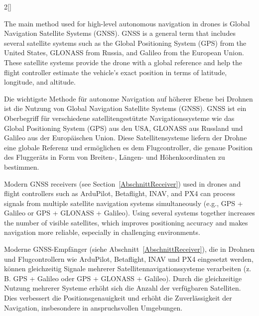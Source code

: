 \begin{paracol}{2}[]
\colende

\renewcommand{\deutschertitel}{GPS-basierte Positionsbestimmung}
\renewcommand{\englischertitel}{GPS-Based Position Estimation}
\makroabschnitt
\label{GpsBasedPosition}

The main method used for high-level autonomous navigation in drones is Global Navigation Satellite Systems (GNSS). GNSS is a general term that includes several satellite systems such as the Global Positioning System (GPS) from the United States, GLONASS from Russia, and Galileo from the European Union. These satellite systems provide the drone with a global reference and help the flight controller estimate the vehicle’s exact position in terms of latitude, longitude, and altitude.

\colger

Die wichtigste Methode für autonome Navigation auf höherer Ebene bei Drohnen ist die Nutzung von Global Navigation Satellite Systems (GNSS). GNSS ist ein Oberbegriff für verschiedene satellitengestützte Navigationssysteme wie das Global Positioning System (GPS) aus den USA, GLONASS aus Russland und Galileo aus der Europäischen Union. Diese Satellitensysteme liefern der Drohne eine globale Referenz und ermöglichen es dem Flugcontroller, die genaue Position des Fluggeräts in Form von Breiten-, Längen- und Höhenkoordinaten zu bestimmen.

\coleng

Modern GNSS receivers (see Section~\ref{AbschnittReceiver}) used in drones and flight controllers such as ArduPilot, Betaflight, INAV, and PX4 can process signals from multiple satellite navigation systems simultaneously (e.g., GPS + Galileo or GPS + GLONASS + Galileo). Using several systems together increases the number of visible satellites, which improves positioning accuracy and makes navigation more reliable, especially in challenging environments.

\colger

Moderne GNSS-Empfänger (siehe Abschnitt~\ref{AbschnittReceiver}), die in Drohnen und Flugcontrollern wie ArduPilot, Betaflight, INAV und PX4 eingesetzt werden, können gleichzeitig Signale mehrerer Satellitennavigationssysteme verarbeiten (z.\,B. GPS + Galileo oder GPS + GLONASS + Galileo). Durch die gleichzeitige Nutzung mehrerer Systeme erhöht sich die Anzahl der verfügbaren Satelliten. Dies verbessert die Positionsgenauigkeit und erhöht die Zuverlässigkeit der Navigation, insbesondere in anspruchsvollen Umgebungen.

\colende


\end{paracol}
